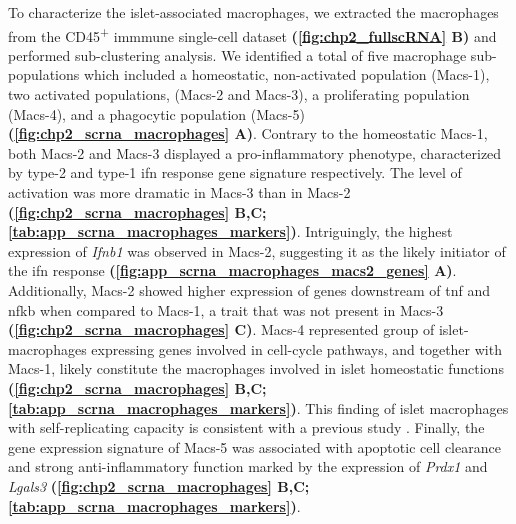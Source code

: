 \par To characterize the islet-associated macrophages, we extracted the macrophages from the CD45\textsuperscript{+} immmune single-cell dataset \textbf{(\autoref{fig:chp2_fullscRNA} B)} and performed sub-clustering analysis. We identified a total of five macrophage sub-populations which included a homeostatic, non-activated population (Macs-1), two activated populations, (Macs-2 and Macs-3), a proliferating population (Macs-4), and a phagocytic population (Macs-5) \textbf{(\autoref{fig:chp2_scrna_macrophages} A)}. Contrary to the homeostatic Macs-1, both Macs-2 and Macs-3 displayed a pro-inflammatory phenotype, characterized by type-2 and type-1 \gls{ifn} response gene signature respectively. The level of activation was more dramatic in Macs-3 than in Macs-2 \textbf{(\autoref{fig:chp2_scrna_macrophages} B,C; \autoref{tab:app_scrna_macrophages_markers})}. Intriguingly, the highest expression of \textit{Ifnb1} was observed in Macs-2, suggesting it as the likely initiator of the \gls{ifn} response \textbf{(\autoref{fig:app_scrna_macrophages_macs2_genes} A)}. Additionally, Macs-2 showed higher expression of genes downstream of \gls{tnf} and \gls{nfkb} when compared to Macs-1, a trait that was not present in Macs-3 \textbf{(\autoref{fig:chp2_scrna_macrophages} C)}. Macs-4 represented group of islet-macrophages expressing genes involved in cell-cycle pathways, and together with Macs-1, likely constitute the macrophages involved in islet homeostatic functions \textbf{(\autoref{fig:chp2_scrna_macrophages} B,C; \autoref{tab:app_scrna_macrophages_markers})}. This finding of islet macrophages with self-replicating capacity is consistent with a previous study \textbf{\cite{calderon_pancreas_2015}}. Finally, the gene expression signature of Macs-5 was associated with apoptotic cell clearance and strong anti-inflammatory function marked by the expression of \textit{Prdx1} and \textit{Lgals3} \textbf{(\autoref{fig:chp2_scrna_macrophages} B,C; \autoref{tab:app_scrna_macrophages_markers})}.\\

